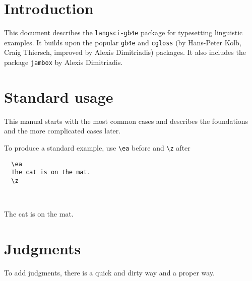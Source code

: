 \documentclass[output=paper]{langscibook}
\newcommand{\cmd}[1]{\texttt{\textbackslash#1}}
\begin{document}

%
%
%
%
%
%
%

\section{Introduction}
This document describes the \texttt{langsci-gb4e} package for typesetting linguistic examples. It builds upon the popular \texttt{gb4e}  and \texttt{cgloss} (by Hans-Peter Kolb, Craig Thiersch, improved by Alexis Dimitriadis) packages. It also includes the package \texttt{jambox} by Alexis Dimitriadis.
\section{Standard usage}
This manual starts with the most common cases and describes the foundations and the more complicated cases later.

To produce a standard example, use \cmd{ea} before and \cmd{z} after

\begin{minipage}[t]{.45\textwidth}
\begin{lstlisting}
  \ea
  The cat is on the mat.
  \z
\end{lstlisting}
\end{minipage}~
\parbox[t]{.45\textwidth}{
  \ea
  The cat is on the mat.
  \z
  }

\section{Judgments}
  To add judgments, there is a quick and dirty way and a proper way.
\end{document}
